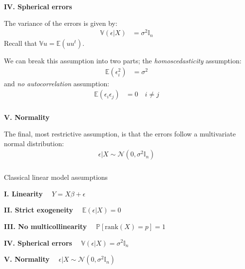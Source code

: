 \begin{frame}[fragile] \frametitle{}

{\bf IV. Spherical errors}

The variance of the errors is given by:
\begin{align*}
\mathbb{V} \left( \epsilon | X \right) &= \sigma^2 \mathbb{I}_n
\end{align*}
Recall that $\mathbb{V} u = \mathbb{E} (u u^t)$.

\pause We can break this assumption into two parts; the
{\it homoscedasticity} assumption:
\begin{align*}
\mathbb{E} ( \epsilon_i^2 ) &= \sigma^2
\end{align*}
and {\it no autocorrelation} assumption:
\begin{align*}
\mathbb{E} ( \epsilon_i \epsilon_j ) &= 0 \quad i \neq j
\end{align*}

\end{frame}

\begin{frame}[fragile] \frametitle{}

{\bf V. Normality}

The final, most restrictive assumption, is that the errors
follow a multivariate normal distribution:
\begin{align*}
\epsilon | X \sim \mathcal{N} (0, \sigma^2 \mathbb{I}_n)
\end{align*}

\end{frame}

\begin{frame}[fragile] \frametitle{}

\begin{center}
{\Large Classical linear model assumptions}
\end{center}

{\bf I. Linearity} $\quad Y = X\beta + \epsilon$

{\bf II. Strict exogeneity} $\quad \mathbb{E} \left( \epsilon | X \right) = 0$

{\bf III. No multicollinearity} $\quad \mathbb{P} \left[ \text{rank} (X) = p \right] = 1$

{\bf IV. Spherical errors} $\quad \mathbb{V} \left( \epsilon | X \right) = \sigma^2 \mathbb{I}_n$

{\bf V. Normality} $\quad \epsilon | X \sim \mathcal{N} (0, \sigma^2 \mathbb{I}_n)$

\end{frame}


